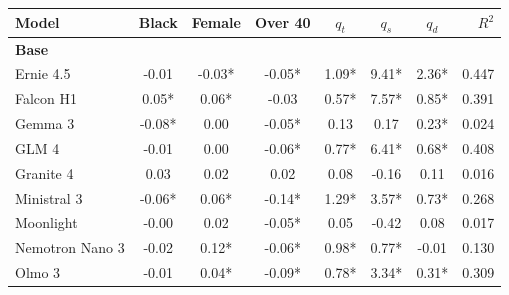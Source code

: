 \begin{table}[p]
\centering
\scriptsize
\setlength{\tabcolsep}{5pt}
\renewcommand{\arraystretch}{1.18}
\begin{tabular}{lccccccr}
\toprule
Model & Black & Female & Over 40 & $q_t$ & $q_s$ & $q_d$ & $R^2$ \\
\midrule
\multicolumn{8}{l}{\textbf{Base}} \\
Ernie 4.5 & \cellcolor[HTML]{FEF8F8}-0.01 & \cellcolor[HTML]{FCE7E5}-0.03* & \cellcolor[HTML]{FAD7D4}-0.05* & \cellcolor[HTML]{87DAAE}1.09* & \cellcolor[HTML]{74D4A2}9.41* & \cellcolor[HTML]{2EBE73}2.36* & 0.447 \\
Falcon H1 & \cellcolor[HTML]{D0F0E0}0.05* & \cellcolor[HTML]{CBEFDC}0.06* & \cellcolor[HTML]{FCEAE8}-0.03 & \cellcolor[HTML]{C0ECD5}0.57* & \cellcolor[HTML]{90DCB4}7.57* & \cellcolor[HTML]{B4E8CC}0.85* & 0.391 \\
Gemma 3 & \cellcolor[HTML]{F7C1BC}-0.08* & \cellcolor[HTML]{FCFEFD}0.00 & \cellcolor[HTML]{FADAD7}-0.05* & \cellcolor[HTML]{F1FBF6}0.13 & \cellcolor[HTML]{FDFEFD}0.17 & \cellcolor[HTML]{EAF9F1}0.23* & 0.024 \\
GLM 4 & \cellcolor[HTML]{FEFBFA}-0.01 & \cellcolor[HTML]{FBFEFC}0.00 & \cellcolor[HTML]{F9D0CC}-0.06* & \cellcolor[HTML]{AAE5C6}0.77* & \cellcolor[HTML]{A1E2C0}6.41* & \cellcolor[HTML]{C2ECD6}0.68* & 0.408 \\
Granite 4 & \cellcolor[HTML]{E1F6EB}0.03 & \cellcolor[HTML]{F0FAF5}0.02 & \cellcolor[HTML]{EAF9F1}0.02 & \cellcolor[HTML]{F6FCF9}0.08 & \cellcolor[HTML]{FFFDFD}-0.16 & \cellcolor[HTML]{F5FCF8}0.11 & 0.016 \\
Ministral 3 & \cellcolor[HTML]{F8CDC8}-0.06* & \cellcolor[HTML]{CEF0DE}0.06* & \cellcolor[HTML]{F09188}-0.14* & \cellcolor[HTML]{70D39F}1.29* & \cellcolor[HTML]{CAEFDC}3.57* & \cellcolor[HTML]{BEEBD4}0.73* & 0.268 \\
Moonlight & \cellcolor[HTML]{FFFDFD}-0.00 & \cellcolor[HTML]{EFFAF5}0.02 & \cellcolor[HTML]{FAD7D3}-0.05* & \cellcolor[HTML]{FAFDFB}0.05 & \cellcolor[HTML]{FEFAF9}-0.42 & \cellcolor[HTML]{F8FDFA}0.08 & 0.017 \\
Nemotron Nano 3 & \cellcolor[HTML]{FDEDEB}-0.02 & \cellcolor[HTML]{9BE0BC}0.12* & \cellcolor[HTML]{F9CFCA}-0.06* & \cellcolor[HTML]{93DDB7}0.98* & \cellcolor[HTML]{F4FBF7}0.77* & \cellcolor[HTML]{FFFEFE}-0.01 & 0.130 \\
Olmo 3 & \cellcolor[HTML]{FEF7F7}-0.01 & \cellcolor[HTML]{DFF5EA}0.04* & \cellcolor[HTML]{F6BDB8}-0.09* & \cellcolor[HTML]{A9E4C5}0.78* & \cellcolor[HTML]{CEF0DE}3.34* & \cellcolor[HTML]{E3F6EC}0.31* & 0.309 \\

\end{tabular}
\end{table}

